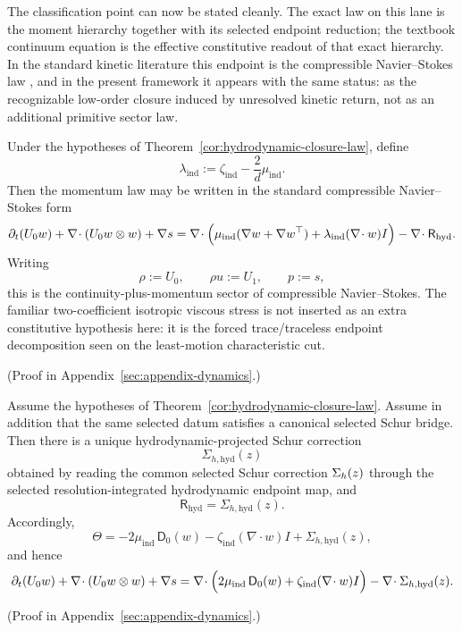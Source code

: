 The classification point can now be stated cleanly. The exact law on this lane
is the moment hierarchy together with its selected endpoint reduction; the
textbook continuum equation is the effective constitutive readout of that
exact hierarchy. In the standard kinetic literature this endpoint is the
compressible Navier--Stokes law
\cite{ChapmanCowling1970,Cercignani1988,Navier1823,Stokes1845}, and in the
present framework it appears with the same status: as the recognizable
low-order closure induced by unresolved kinetic return, not as an additional
primitive sector law.

\begin{corollary}
\label{cor:recognizable-navier-stokes-form}
Under the hypotheses of Theorem~\ref{cor:hydrodynamic-closure-law}, define
\[
\lambda_{\mathrm{ind}}
:=
\zeta_{\mathrm{ind}}-\frac{2}{d}\mu_{\mathrm{ind}}.
\]
Then the momentum law may be written in the standard compressible
Navier--Stokes form
\[
\partial_t(U_0 w)
+
\nabla\!\cdot(U_0 w\otimes w)
+
\nabla s
=
\nabla\!\cdot\Bigl(
\mu_{\mathrm{ind}}(\nabla w+\nabla w^\top)
+
\lambda_{\mathrm{ind}}(\nabla\!\cdot w)I
\Bigr)
-\nabla\!\cdot \mathsf R_{\mathrm{hyd}}.
\]
Writing
\[
\rho:=U_0,
\qquad
\rho u:=U_1,
\qquad
p:=s,
\]
this is the continuity-plus-momentum sector of compressible Navier--Stokes.
The familiar two-coefficient isotropic viscous stress is not inserted as an
extra constitutive hypothesis here: it is the forced trace/traceless endpoint
decomposition seen on the least-motion characteristic cut.
\end{corollary}

(Proof in Appendix~\ref{sec:appendix-dynamics}.)

\begin{corollary}
\label{cor:hydrodynamic-schur-remainder-identity}
Assume the hypotheses of Theorem~\ref{cor:hydrodynamic-closure-law}. Assume in
addition that the same selected datum satisfies a canonical selected Schur
bridge. Then there is a unique hydrodynamic-projected Schur correction
\[
\Sigma_{h,\mathrm{hyd}}(z)
\]
obtained by reading the common selected Schur correction \(\Sigma_{h}(z)\)
through the selected resolution-integrated hydrodynamic endpoint map, and
\[
\mathsf R_{\mathrm{hyd}}=\Sigma_{h,\mathrm{hyd}}(z).
\]
Accordingly,
\[
\Theta
=
-2\mu_{\mathrm{ind}}\,\mathsf D_0(w)
-\zeta_{\mathrm{ind}}(\nabla\!\cdot w)I
+
\Sigma_{h,\mathrm{hyd}}(z),
\]
and hence
\[
\partial_t(U_0 w)
+
\nabla\!\cdot(U_0 w\otimes w)
+
\nabla s
=
\nabla\!\cdot\Bigl(
2\mu_{\mathrm{ind}}\,\mathsf D_0(w)
+
\zeta_{\mathrm{ind}}(\nabla\!\cdot w)I
\Bigr)
-\nabla\!\cdot \Sigma_{h,\mathrm{hyd}}(z).
\]
\end{corollary}

(Proof in Appendix~\ref{sec:appendix-dynamics}.)
